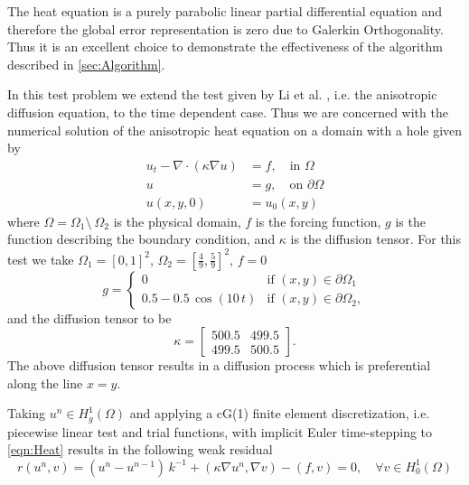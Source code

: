 \begin{test} \label{tst:Heat}

  The heat equation is a purely parabolic linear partial differential equation
  and therefore the global error representation is zero due to Galerkin
  Orthogonality.  Thus it is an excellent choice to demonstrate the
  effectiveness of the algorithm described in \autoref{sec:Algorithm}.

  In this test problem we extend the test given by Li et al.
  \cite[Example 5.1]{Li2010}, i.e. the anisotropic diffusion equation, to the
  time dependent case. Thus we are concerned with the numerical solution of the
  anisotropic heat equation on a domain with a hole given by
  \begin{equation} \label{eqn:Heat}
    \begin{split}
      u_t - \nabla \cdot (\kappa \nabla u) &= f, \quad \text{in } \Omega \\
      u &= g, \quad \text{on } \partial \Omega \\
      u(x,y,0) &= u_0(x,y)
    \end{split}
  \end{equation}
  where $\Omega = \Omega_1\setminus~\Omega_2$ is the physical domain, $f$ is the
  forcing function, $g$ is the function describing the boundary condition, and
  $\kappa$ is the diffusion tensor. For this test we take $\Omega_1 = [0,
  1]^2$, $\Omega_2 = [\frac{4}{9}, \frac{5}{9}]^2$, $f = 0$
  \begin{equation}
    g = \begin{cases}
        0 & \text{if } (x,y) \in \partial \Omega_1 \\
        0.5 - 0.5\, \cos(10\, t) & \text{if } (x,y) \in \partial \Omega_2,
    \end{cases}
    \label{eqn:BCFunction}
  \end{equation}
  and the diffusion tensor to be
  \begin{equation}
    \kappa = \begin{bmatrix} 500.5 & 499.5 \\ 499.5 & 500.5 \end{bmatrix}.
    \label{eqn:DiffusionTensor}
  \end{equation}
  The above diffusion tensor results in a diffusion process which is
  preferential along the line $x = y$.

  Taking $u^n \in H^1_g(\Omega)$ and applying a cG(1) finite element
  discretization, i.e. piecewise linear test and trial functions, with implicit
  Euler time-stepping to \eqref{eqn:Heat} results in the following weak residual
  \begin{equation}
    r(u^n, v) = (u^n - u^{n-1})\, k^{-1} + (\kappa \nabla u^n, \nabla v)
      - (f, v) = 0, \quad \forall v \in H^1_0(\Omega)
    \label{eqn:HeatWeak}
  \end{equation}

\end{test}

